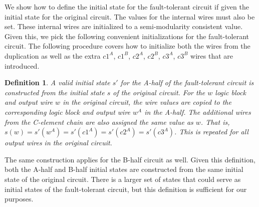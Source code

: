 \documentclass[12pt]{report}
\newtheorem*{definition}{Definition}
\begin{document}
We show how to define the initial state for the fault-tolerant circuit if given the initial state for the original circuit.  The values for the internal wires must also be set.  These internal wires are initialized to a semi-modularity consistent value.  Given this, we pick the following convenient initializations for the fault-tolerant circuit.  The following procedure covers how to initialize both the wires from the duplication as well as the extra $c1^A$, $c1^B$, $c2^A$, $c2^B$, $c3^A$, $c3^B$ wires that are introduced.
\begin{definition} A {\em valid initial state} $s'$ for the A-half of the fault-tolerant circuit is constructed from the initial state $s$ of the original circuit.  
For the $w$ logic block and output wire $w$ in the original circuit, the wire values are copied to the corresponding logic block and output wire $w^A$ in the A-half.  The additional wires from the C-element chain are also assigned the same value as $w$.  That is, $s(w)=s'(w^A)=s'(c1^A)=s'(c2^A)=s'(c3^A)$.  This is repeated for all output wires in the original circuit. 
\end{definition}
The same construction applies for the B-half circuit as well.  Given this definition, both the A-half and B-half initial states are constructed from the same initial state of the original circuit.  
There is a larger set of states that could serve as initial states of the fault-tolerant circuit, but this definition is sufficient for our purposes.\\
\end{document}
